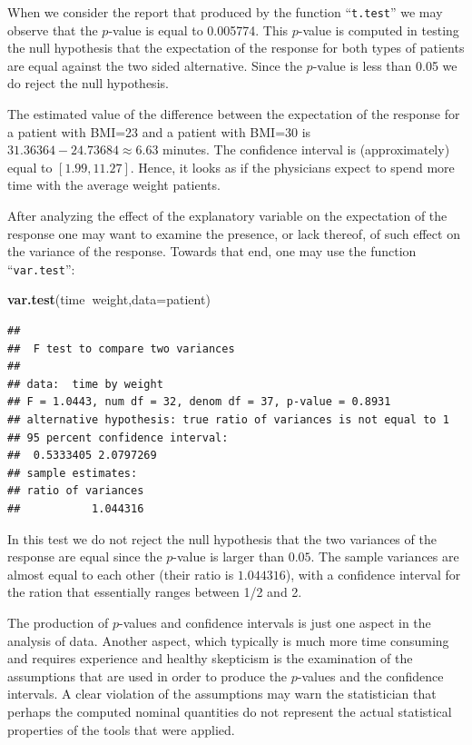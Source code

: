 \documentclass[
]{krantz}
\makeatletter
\newenvironment{Shaded}{\begin{snugshade}}{\end{snugshade}}
\newcommand{\DataTypeTok}[1]{\textcolor[rgb]{0.13,0.29,0.53}{#1}}
\newcommand{\KeywordTok}[1]{\textcolor[rgb]{0.13,0.29,0.53}{\textbf{#1}}}
\newcommand{\NormalTok}[1]{#1}
\newcommand{\OperatorTok}[1]{\textcolor[rgb]{0.81,0.36,0.00}{\textbf{#1}}}
\newenvironment{kframe}{%
\medskip{}
\setlength{\fboxsep}{.8em}
 \def\at@end@of@kframe{}%
 \ifinner\ifhmode%
  \def\at@end@of@kframe{\end{minipage}}%
  \begin{minipage}{\columnwidth}%
 \fi\fi%
 \def\FrameCommand##1{\hskip\@totalleftmargin \hskip-\fboxsep
 \colorbox{shadecolor}{##1}\hskip-\fboxsep
     \hskip-\linewidth \hskip-\@totalleftmargin \hskip\columnwidth}%
 \MakeFramed {\advance\hsize-\width
   \@totalleftmargin\z@ \linewidth\hsize
   \@setminipage}}%
 {\par\unskip\endMakeFramed%
 \at@end@of@kframe}
\renewenvironment{Shaded}{\begin{kframe}}{\end{kframe}}
\theoremstyle{definition}
\theoremstyle{definition}
\theoremstyle{definition}
\theoremstyle{remark}
\makeatother
\begin{document}
When we consider the report that produced by the function ``\texttt{t.test}'' we
may observe that the \(p\)-value is equal to 0.005774. This \(p\)-value is
computed in testing the null hypothesis that the expectation of the
response for both types of patients are equal against the two sided
alternative. Since the \(p\)-value is less than 0.05 we do reject the null
hypothesis.

The estimated value of the difference between the expectation of the
response for a patient with BMI=23 and a patient with BMI=30 is
\(31.36364 -24.73684 \approx 6.63\) minutes. The confidence interval is
(approximately) equal to \([1.99, 11.27]\). Hence, it looks as if the
physicians expect to spend more time with the average weight patients.

After analyzing the effect of the explanatory variable on the
expectation of the response one may want to examine the presence, or
lack thereof, of such effect on the variance of the response. Towards
that end, one may use the function ``\texttt{var.test}'':

\begin{Shaded}
\begin{Highlighting}[]
\KeywordTok{var.test}\NormalTok{(time}\OperatorTok{~}\NormalTok{weight,}\DataTypeTok{data=}\NormalTok{patient)}
\end{Highlighting}
\end{Shaded}

\begin{verbatim}
## 
##  F test to compare two variances
## 
## data:  time by weight
## F = 1.0443, num df = 32, denom df = 37, p-value = 0.8931
## alternative hypothesis: true ratio of variances is not equal to 1
## 95 percent confidence interval:
##  0.5333405 2.0797269
## sample estimates:
## ratio of variances 
##           1.044316
\end{verbatim}

In this test we do not reject the null hypothesis that the two variances
of the response are equal since the \(p\)-value is larger than \(0.05\). The
sample variances are almost equal to each other (their ratio is
\(1.044316\)), with a confidence interval for the ration that essentially
ranges between 1/2 and 2.

The production of \(p\)-values and confidence intervals is just one aspect
in the analysis of data. Another aspect, which typically is much more
time consuming and requires experience and healthy skepticism is the
examination of the assumptions that are used in order to produce the
\(p\)-values and the confidence intervals. A clear violation of the
assumptions may warn the statistician that perhaps the computed nominal
quantities do not represent the actual statistical properties of the
tools that were applied.
\end{document}
